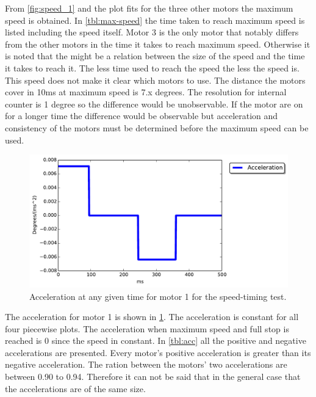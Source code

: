 From \cref{fig:speed_1} and the plot fits for the three other motors the maximum speed is obtained. In \cref{tbl:max-speed} the time taken to reach maximum speed is listed including the speed itself. Motor 3 is the only motor that notably differs from the other motors in the time it takes to reach maximum speed. Otherwise it is noted that the might be a relation between the size of the speed and the time it takes to reach it. The less time used to reach the speed the less the speed is. This speed does not make it clear which motors to use. The distance the motors cover in 10ms at maximum speed is 7.x degrees. The resolution for internal counter is 1 degree so the difference would be unobservable. If the motor are on for a longer time the difference would be observable but acceleration and consistency of the motors must be determined before the maximum speed can be used.

\begin{figure}[!htb]
    \centering
	\includegraphics[width=1\textwidth]{test_res/speed_tests/Acc_motor1.pdf}
     \caption{Acceleration at any given time for motor 1 for the speed-timing test.}
	\label{fig:acc_1}
\end{figure}

The acceleration for motor 1 is shown in \cref{fig:acc_1}. The acceleration is constant for all four piecewise plots. The acceleration when maximum speed and full stop is reached is 0 since the speed in constant. In \cref{tbl:acc} all the positive and negative accelerations are presented. Every motor's positive acceleration is greater than its negative acceleration. The ration between the motors' two accelerations are between 0.90 to 0.94. Therefore it can not be said that in the general case that the accelerations are of the same size.

